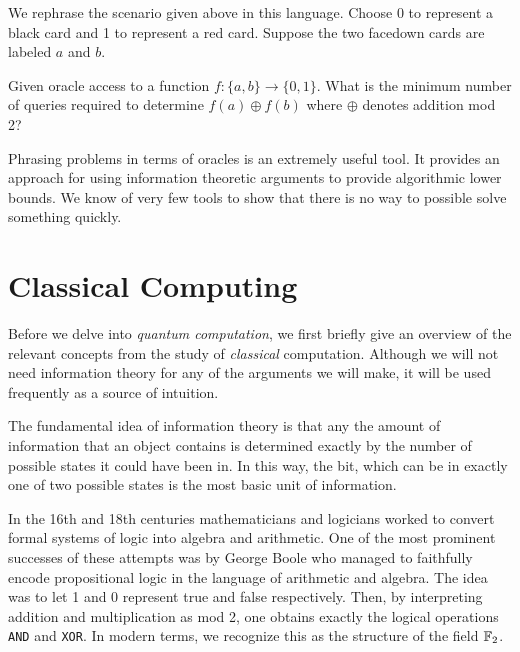         We rephrase the scenario given above in this language.  Choose 0 to represent a black card and 1 to
        represent a red card. Suppose the two facedown cards are labeled $a$ and $b$.   
       
        \begin{example} 
            Given oracle access to a function $f: \{a, b\} \rightarrow \{0, 1\}$. What is the minimum number of
            queries required to determine $f(a) \oplus f(b)$ where $\oplus$ denotes addition mod 2?
        \end{example}
        


        Phrasing problems in terms of oracles is an extremely useful tool. It provides an approach for using 
        information theoretic arguments to provide algorithmic lower bounds. We know of very few tools to show that 
        there is no way to possible solve something quickly.

        \begin{example}
        \end{example}
        

\section{Classical Computing}
    
        Before we delve into  \emph{quantum computation}, we first briefly give an overview of the relevant 
        concepts from the study of \emph{classical} computation. Although we will not need information theory for 
        any of the arguments we will make, it will be used frequently as a source of intuition.

        The fundamental idea of information theory is that any the amount of information that an object contains is 
        determined exactly by the number of possible states it could have been in. In this way, the bit, which can 
        be in exactly one of two possible states is the most basic unit of information.


        In the 16th and 18th centuries mathematicians and logicians worked to convert formal systems of logic into 
        algebra and arithmetic. One of the most prominent successes of these attempts was by George Boole who 
        managed to faithfully encode propositional logic in the language of arithmetic and algebra. The idea was to 
        let 1 and 0 represent true and false respectively. Then, by interpreting addition and multiplication as mod 
        2, one obtains exactly the logical operations \texttt{AND} and  \texttt{XOR}. In modern terms, we recognize 
        this as the structure of the field $\mathbb{F}_2$. 


